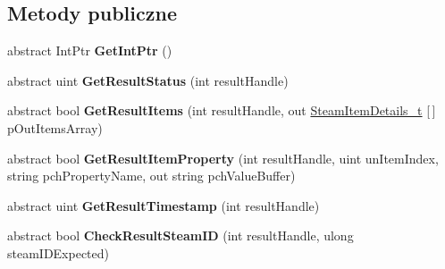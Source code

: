 \subsection*{Metody publiczne}
\begin{DoxyCompactItemize}
\item 
\mbox{\label{class_valve_1_1_steamworks_1_1_i_steam_inventory_a945c0ad486580f85db879b8d16079bdc}} 
abstract Int\+Ptr {\bfseries Get\+Int\+Ptr} ()
\item 
\mbox{\label{class_valve_1_1_steamworks_1_1_i_steam_inventory_a7f9e72b9a89e2837586905c84e01835c}} 
abstract uint {\bfseries Get\+Result\+Status} (int result\+Handle)
\item 
\mbox{\label{class_valve_1_1_steamworks_1_1_i_steam_inventory_a5c76eda9fd484fb21e827b1ffa6ff6f9}} 
abstract bool {\bfseries Get\+Result\+Items} (int result\+Handle, out \hyperlink{struct_valve_1_1_steamworks_1_1_steam_item_details__t}{Steam\+Item\+Details\+\_\+t} \mbox{[}$\,$\mbox{]} p\+Out\+Items\+Array)
\item 
\mbox{\label{class_valve_1_1_steamworks_1_1_i_steam_inventory_a897ce0379ee2e62265096da55c861d93}} 
abstract bool {\bfseries Get\+Result\+Item\+Property} (int result\+Handle, uint un\+Item\+Index, string pch\+Property\+Name, out string pch\+Value\+Buffer)
\item 
\mbox{\label{class_valve_1_1_steamworks_1_1_i_steam_inventory_a3a049b0eed5bc583c6ae781e8ec675e2}} 
abstract uint {\bfseries Get\+Result\+Timestamp} (int result\+Handle)
\item 
\mbox{\label{class_valve_1_1_steamworks_1_1_i_steam_inventory_a8628cff2db1fe3ef51c90e3b8164e4a8}} 
abstract bool {\bfseries Check\+Result\+Steam\+ID} (int result\+Handle, ulong steam\+I\+D\+Expected)
\item 
\mbox{\label{class_valve_1_1_steamworks_1_1_i_steam_inventory_a1b119a6fe54631f08f5e7b19444274e9}} 

\end{DoxyCompactItemize}
